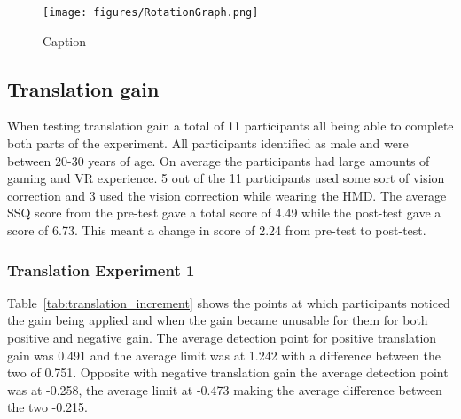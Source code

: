 \begin{figure}
    \centering
    \texttt{[image: figures/RotationGraph.png]}
    \caption{Caption}
    \label{fig:rotation_graph}
\end{figure}

\subsection{Translation gain}
When testing translation gain a total of 11 participants all being able to complete both parts of the experiment. All participants identified as male and were between 20-30 years of age. On average the participants had large amounts of gaming and VR experience. 5 out of the 11 participants used some sort of vision correction and 3 used the vision correction while wearing the HMD. The average SSQ score from the pre-test gave a total score of 4.49 while the post-test gave a score of 6.73. This meant a change in score of 2.24 from pre-test to post-test.

\subsubsection{Translation Experiment 1}
Table~\ref{tab:translation_increment} shows the points at which participants noticed the gain being applied and when the gain became unusable for them for both positive and negative gain. The average detection point for positive translation gain was 0.491 and the average limit was at 1.242 with a difference between the two of 0.751. Opposite with negative translation gain the average detection point was at -0.258, the average limit at -0.473 making the average difference between the two -0.215.


